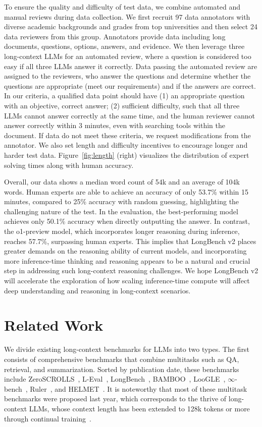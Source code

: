 To ensure the quality and difficulty of test data, we combine automated and manual reviews during data collection. 
We first recruit 97 data annotators with diverse academic backgrounds and grades from top universities and then select 24 data reviewers from this group.
Annotators provide data including long documents, questions, options, answers, and evidence.
We then leverage three long-context LLMs for an automated review, where a question is considered too easy if all three LLMs answer it correctly.
Data passing the automated review are assigned to the reviewers, who answer the questions and determine whether the questions are appropriate (meet our requirements) and if the answers are correct.
In our criteria, a qualified data point should have (1) an appropriate question with an objective, correct answer; (2) sufficient difficulty, such that all three LLMs cannot answer correctly at the same time, and the human reviewer cannot answer correctly within 3 minutes, even with searching tools within the document.
If data do not meet these criteria, we request modifications from the annotator.
We also set length and difficulty incentives to encourage longer and harder test data.
Figure~\ref{fig:length} (right) visualizes the distribution of expert solving times along with human accuracy.

Overall, our data shows a median word count of 54k and an average of 104k words. 
Human experts are able to achieve an accuracy of only 53.7\% within 15 minutes, compared to 25\% accuracy with random guessing, highlighting the challenging nature of the test.
In the evaluation, the best-performing model achieves only 50.1\% accuracy when directly outputting the answer. In contrast, the o1-preview model, which incorporates longer reasoning during inference, reaches 57.7\%, surpassing human experts. This implies that LongBench v2 places greater demands on the reasoning ability of current models, and incorporating more inference-time thinking and reasoning appears to be a natural and crucial step in addressing such long-context reasoning challenges.
We hope LongBench v2 will accelerate the exploration of how scaling inference-time compute will affect deep understanding and reasoning in long-context scenarios.
\section{Related Work}

We divide existing long-context benchmarks for LLMs into two types. 
The first consists of comprehensive benchmarks that combine multitasks such as QA, retrieval, and summarization. 
Sorted by publication date, these benchmarks include ZeroSCROLLS~\cite{shaham2023zeroscrolls}, L-Eval~\cite{an2024leval}, LongBench~\cite{bai2024longbench}, BAMBOO~\cite{dong2024bamboo}, LooGLE~\cite{li2023loogle}, $\infty$-bench~\cite{zhang2024infty}, Ruler~\cite{hsieh2024ruler}, and HELMET~\cite{yen2024helmet}.
It is noteworthy that most of these multitask benchmarks were proposed last year, which corresponds to the thrive of long-context LLMs, whose context length has been extended to 128k tokens or more~\cite{claude-3-5,GPT-4o,reid2024gemini,glm2024chatglm,dubey2024llama} through continual training~\cite{xiong2024effective,pmlr-v235-fu24d,bai2024longalign,gao2024train}.

